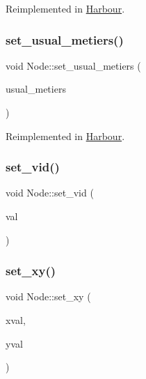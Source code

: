 Reimplemented in \mbox{\hyperlink{class_harbour_a27f372be53f0c5b8ed44e9eaf7377209}{Harbour}}.

\mbox{\label{class_node_ad2630b68ea7d53b00c47a5ea1d6e4662}} 
\subsubsection{\texorpdfstring{set\_usual\_metiers()}{set\_usual\_metiers()}}
{\footnotesize\ttfamily void Node\+::set\+\_\+usual\+\_\+metiers (\begin{DoxyParamCaption}\item[{multimap$<$ \mbox{\hyperlink{classtypes_1_1_node_id}{types\+::\+Node\+Id}}, int $>$}]{usual\+\_\+metiers }\end{DoxyParamCaption})\hspace{0.3cm}{\ttfamily [virtual]}}



Reimplemented in \mbox{\hyperlink{class_harbour_ab7446ddd7d8aa93a0655ce899232fa66}{Harbour}}.

\mbox{\label{class_node_a87ebb1122c0ba7806446668c66eae287}} 
\subsubsection{\texorpdfstring{set\_vid()}{set\_vid()}}
{\footnotesize\ttfamily void Node\+::set\+\_\+vid (\begin{DoxyParamCaption}\item[{int}]{val }\end{DoxyParamCaption})}

\mbox{\label{class_node_adf75ff7dc8ebec8b3c65a6a73ecfa739}} 
\subsubsection{\texorpdfstring{set\_xy()}{set\_xy()}}
{\footnotesize\ttfamily void Node\+::set\+\_\+xy (\begin{DoxyParamCaption}\item[{double}]{xval,  }\item[{double}]{yval }\end{DoxyParamCaption})}


